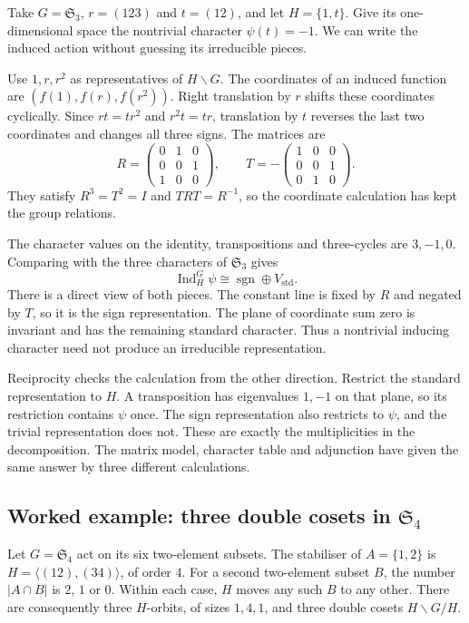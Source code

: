 Take $G=\mathfrak S_3$, $r=(123)$ and $t=(12)$, and let $H=\{1,t\}$. Give its one-dimensional space the nontrivial character $\psi(t)=-1$. We can write the induced action without guessing its irreducible pieces.

Use $1,r,r^2$ as representatives of $H\backslash G$. The coordinates of an induced function are $(f(1),f(r),f(r^2))$. Right translation by $r$ shifts these coordinates cyclically. Since $rt=tr^2$ and $r^2t=tr$, translation by $t$ reverses the last two coordinates and changes all three signs. The matrices are
\[
 R=\begin{pmatrix}0&1&0\\0&0&1\\1&0&0\end{pmatrix},\qquad
 T=-\begin{pmatrix}1&0&0\\0&0&1\\0&1&0\end{pmatrix}.
\]
They satisfy $R^3=T^2=I$ and $TRT=R^{-1}$, so the coordinate calculation has kept the group relations.

The character values on the identity, transpositions and three-cycles are $3,-1,0$. Comparing with the three characters of $\mathfrak S_3$ gives
\[
 \operatorname{Ind}_H^G\psi\cong\operatorname{sgn}\oplus V_{\mathrm{std}}.
\]
There is a direct view of both pieces. The constant line is fixed by $R$ and negated by $T$, so it is the sign representation. The plane of coordinate sum zero is invariant and has the remaining standard character. Thus a nontrivial inducing character need not produce an irreducible representation.

Reciprocity checks the calculation from the other direction. Restrict the standard representation to $H$. A transposition has eigenvalues $1,-1$ on that plane, so its restriction contains $\psi$ once. The sign representation also restricts to $\psi$, and the trivial representation does not. These are exactly the multiplicities in the decomposition. The matrix model, character table and adjunction have given the same answer by three different calculations.

\subsection*{Worked example: three double cosets in $\mathfrak S_4$}

Let $G=\mathfrak S_4$ act on its six two-element subsets. The stabiliser of $A=\{1,2\}$ is $H=\langle(12),(34)\rangle$, of order $4$. For a second two-element subset $B$, the number $|A\cap B|$ is $2$, $1$ or $0$. Within each case, $H$ moves any such $B$ to any other. There are consequently three $H$-orbits, of sizes $1,4,1$, and three double cosets $H\backslash G/H$.

